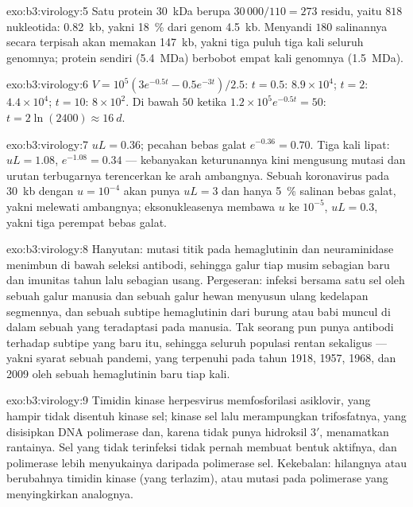 \begin{solution}{exo:b3:virology:5}
Satu protein \qty{30}{kDa} berupa $30\,000/110 = 273$ residu, yaitu $818$
nukleotida: \qty{0.82}{kb}, yakni \qty{18}{\%} dari genom \qty{4.5}{kb}.
Menyandi $180$ salinannya secara terpisah akan memakan \qty{147}{kb},
yakni tiga puluh tiga kali seluruh genomnya; protein  sendiri
(\qty{5.4}{MDa}) berbobot empat kali genomnya (\qty{1.5}{MDa}).
\end{solution}

\begin{solution}{exo:b3:virology:6}
$V = 10^{5}(3e^{-0.5t} - 0.5e^{-3t})/2.5$: $t = 0.5$: $8.9\times
10^{4}$; $t = 2$: $4.4\times 10^{4}$; $t = 10$: $8\times 10^{2}$. Di bawah
$50$ ketika $1.2\times 10^{5}e^{-0.5t} = 50$: $t = 2\ln(2400) \approx
\qty{16}{d}$.
\end{solution}

\begin{solution}{exo:b3:virology:7}
$uL = 0.36$; pecahan bebas galat $e^{-0.36} = 0.70$. Tiga kali lipat: $uL =
1.08$, $e^{-1.08} = 0.34$ --- kebanyakan keturunannya kini mengusung mutasi
dan urutan terbugarnya terencerkan ke arah ambangnya. Sebuah koronavirus pada
\qty{30}{kb} dengan $u = 10^{-4}$ akan punya $uL = 3$ dan hanya \qty{5}{\%}
salinan bebas galat, yakni melewati ambangnya; eksonukleasenya membawa $u$ ke
$10^{-5}$, $uL = 0.3$, yakni tiga perempat bebas galat.
\end{solution}

\begin{solution}{exo:b3:virology:8}
Hanyutan: mutasi titik pada hemaglutinin dan neuraminidase menimbun di bawah
seleksi antibodi, sehingga galur tiap musim sebagian baru dan imunitas tahun
lalu sebagian usang. Pergeseran: infeksi bersama satu sel oleh sebuah galur
manusia dan sebuah galur hewan menyusun ulang kedelapan segmennya, dan sebuah
subtipe hemaglutinin dari burung atau babi muncul di dalam sebuah  yang
teradaptasi pada manusia. Tak seorang pun punya antibodi terhadap subtipe yang
baru itu, sehingga seluruh populasi rentan sekaligus --- yakni syarat sebuah
pandemi, yang terpenuhi pada tahun 1918, 1957, 1968, dan 2009 oleh sebuah
hemaglutinin baru tiap kali.
\end{solution}

\begin{solution}{exo:b3:virology:9}
Timidin kinase herpesvirus memfosforilasi asiklovir, yang hampir tidak
disentuh kinase sel; kinase sel lalu merampungkan trifosfatnya, yang
disisipkan DNA polimerase  dan, karena tidak punya hidroksil 3$'$,
menamatkan rantainya. Sel yang tidak terinfeksi tidak pernah membuat bentuk
aktifnya, dan polimerase  lebih menyukainya daripada polimerase sel.
Kekebalan: hilangnya atau berubahnya timidin kinase  (yang
terlazim), atau mutasi pada polimerase  yang menyingkirkan
analognya.
\end{solution}

